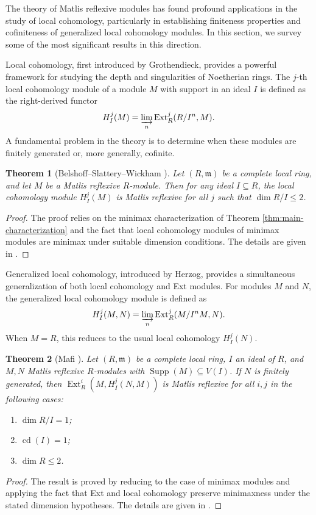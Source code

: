 \documentclass{kms-c}
\theoremstyle{plain}
\newtheorem{theorem}{Theorem}[section]
\theoremstyle{definition}
\theoremstyle{remark}
\begin{document}
The theory of Matlis reflexive modules has found profound applications in the study of local cohomology, particularly in establishing finiteness properties and cofiniteness of generalized local cohomology modules. In this section, we survey some of the most significant results in this direction.

Local cohomology, first introduced by Grothendieck, provides a powerful framework for studying the depth and singularities of Noetherian rings. The \( j \)-th local cohomology module of a module \( M \) with support in an ideal \( I \) is defined as the right-derived functor
\[
H_I^j(M) = \varinjlim_{n} \operatorname{Ext}_R^j(R/I^n, M).
\]
A fundamental problem in the theory is to determine when these modules are finitely generated or, more generally, cofinite.

\begin{theorem}[Belshoff--Slattery--Wickham \cite{Belshoff1996b}]
\label{thm:belshoff}
Let \( (R, \mathfrak{m}) \) be a complete local ring, and let \( M \) be a Matlis reflexive \( R \)-module. Then for any ideal \( I \subseteq R \), the local cohomology module \( H_I^j(M) \) is Matlis reflexive for all \( j \) such that \( \dim R/I \leq 2 \).
\end{theorem}
\begin{proof}
The proof relies on the minimax characterization of Theorem \ref{thm:main-characterization} and the fact that local cohomology modules of minimax modules are minimax under suitable dimension conditions. The details are given in \cite[Theorem 3.2]{Belshoff1996b}. 
\end{proof}

Generalized local cohomology, introduced by Herzog, provides a simultaneous generalization of both local cohomology and Ext modules. For modules \( M \) and \( N \), the generalized local cohomology module is defined as
\[
H_I^j(M, N) = \varinjlim_{n} \operatorname{Ext}_R^j(M/I^n M, N).
\]
When \( M = R \), this reduces to the usual local cohomology \( H_I^j(N) \).

\begin{theorem}[Mafi \cite{Mafi2009}]
\label{thm:mafi}
Let \( (R, \mathfrak{m}) \) be a complete local ring, \( I \) an ideal of \( R \), and \( M, N \) Matlis reflexive \( R \)-modules with \( \operatorname{Supp}(M) \subseteq V(I) \). If \( N \) is finitely generated, then \( \operatorname{Ext}_R^i(M, H_I^j(N, M)) \) is Matlis reflexive for all \( i, j \) in the following cases:
\begin{enumerate}
\item \( \dim R/I = 1 \);
\item \( \operatorname{cd}(I) = 1 \);
\item \( \dim R \leq 2 \).
\end{enumerate}
\end{theorem}
\begin{proof}
The result is proved by reducing to the case of minimax modules and applying the fact that Ext and local cohomology preserve minimaxness under the stated dimension hypotheses. The details are given in \cite[Theorems 2.5, 2.7]{Mafi2009}. 
\end{proof}
\end{document}
